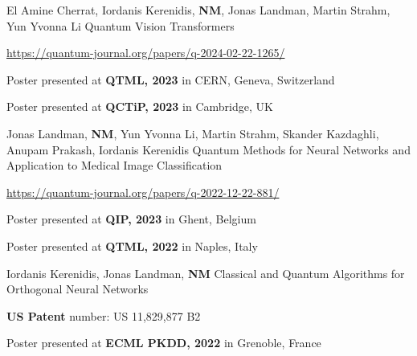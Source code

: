 \begin{cventries}
  \cventry
    {El Amine Cherrat, Iordanis Kerenidis, \textbf{NM}, Jonas Landman, Martin Strahm, Yun Yvonna Li} %
    {Quantum Vision Transformers} %
    {} %
    {}
    {
      \begin{cvitems} %
        \item {\href{https://quantum-journal.org/papers/q-2024-02-22-1265/}{https://quantum-journal.org/papers/q-2024-02-22-1265/}}
        \item {Poster presented at \textbf{QTML, 2023} in CERN, Geneva, Switzerland}
        \item {Poster presented at \textbf{QCTiP, 2023} in Cambridge, UK}
      \end{cvitems}
    }

  \cventry
    {Jonas Landman, \textbf{NM}, Yun Yvonna Li, Martin Strahm, Skander Kazdaghli, Anupam Prakash, Iordanis Kerenidis} %
    {Quantum Methods for Neural Networks and Application to Medical Image Classification} %
    {} %
    {}
    {
      \begin{cvitems} %
        \item {\href{https://quantum-journal.org/papers/q-2022-12-22-881/}{https://quantum-journal.org/papers/q-2022-12-22-881/}}
        \item {Poster presented at \textbf{QIP, 2023} in Ghent, Belgium}
        \item {Poster presented at \textbf{QTML, 2022} in Naples, Italy}
      \end{cvitems}
    }


  \cventry
    {Iordanis Kerenidis, Jonas Landman, \textbf{NM}} %
    {Classical and Quantum Algorithms for Orthogonal Neural Networks} %
    {} %
    {}
    {
      \begin{cvitems} %
        \item {\textbf{US Patent} number: US 11,829,877 B2}
        \item {Poster presented at \textbf{ECML PKDD, 2022} in Grenoble, France}
      \end{cvitems}
    }



\end{cventries}
